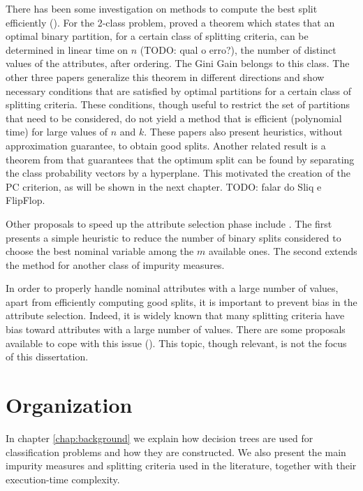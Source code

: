 There has been  some investigation on 
methods to compute the best split efficiently 
(\cite{Breiman84,Chou:91,BPKN:92,journals/datamine/CoppersmithHH99}).
For the 2-class problem,  \cite{Breiman84} proved a theorem which states that an optimal
binary partition, for a certain class of splitting criteria,
can be determined in linear time on $n$ (TODO: qual o erro?), the number of distinct values of the attributes, after ordering.
The Gini  Gain belongs to this class.
The  other  three papers generalize
this theorem  in different directions 
and show necessary conditions that are satisfied by optimal partitions for a certain class of splitting criteria. 
These conditions, though useful to restrict the set of partitions
that need to be considered, do not yield  a method that
is efficient (polynomial time) for large values of $n$ and $k$. These papers also  present  heuristics, without approximation guarantee, to obtain good splits.
Another related result is a theorem from \cite{journals/datamine/CoppersmithHH99} that guarantees that the optimum split can be found by separating the class probability vectors by a hyperplane. This motivated the creation of the PC criterion, as will be shown in the next chapter. TODO: falar do Sliq e FlipFlop.

Other proposals to  speed up the attribute selection phase
 include  \cite{MolaSiciliano1997,Shih2001}. 
The first presents a simple  heuristic
to reduce the number of binary splits considered to
choose the best nominal variable among the $m$ available ones.
 The second   extends the method for another class
of impurity measures.

In order to properly
handle nominal attributes with a large number of values,
apart from efficiently computing good splits, it is
important to prevent bias in the attribute selection.
Indeed, it is widely  known that many splitting criteria have bias toward
attributes with a large number of values. There are some  proposals available
to cope with this issue 
(\cite{conf/icml/DobraG01,Shih2004,Hothorn:2006:URP}). 
This topic, though relevant, is not the focus of this dissertation.

\section{Organization}
\label{sec:organization}
In chapter \ref{chap:background} we explain how decision trees are used for classification problems and how they are constructed. We also present the main impurity measures and splitting criteria used in the literature, together with their execution-time complexity.

